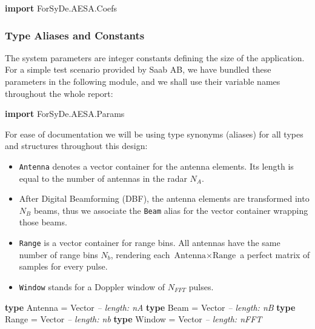 \documentclass[
  a4paper,
]{article}
\newenvironment{Shaded}{}{}
\newcommand{\CommentTok}[1]{\textcolor[rgb]{0.38,0.63,0.69}{\textit{#1}}}
\newcommand{\DataTypeTok}[1]{\textcolor[rgb]{0.56,0.13,0.00}{#1}}
\newcommand{\FunctionTok}[1]{\textcolor[rgb]{0.02,0.16,0.49}{#1}}
\newcommand{\KeywordTok}[1]{\textcolor[rgb]{0.00,0.44,0.13}{\textbf{#1}}}
\begin{document}
\begin{Shaded}
\begin{Highlighting}[numbers=left,,firstnumber=81,]
\KeywordTok{import} \DataTypeTok{ForSyDe.AESA.Coefs}
\end{Highlighting}
\end{Shaded}

\hypertarget{sec:aliases-shallow}{%
\subsubsection{Type Aliases and Constants}\label{sec:aliases-shallow}}

The system parameters are integer constants defining the size of the
application. For a simple test scenario provided by Saab AB, we have
bundled these parameters in the following module, and we shall use their
variable names throughout the whole report:

\begin{Shaded}
\begin{Highlighting}[numbers=left,,firstnumber=89,]
\KeywordTok{import} \DataTypeTok{ForSyDe.AESA.Params}
\end{Highlighting}
\end{Shaded}

For ease of documentation we will be using type synonyms (aliases) for
all types and structures throughout this design:

\begin{itemize}
\item
  \texttt{Antenna} denotes a vector container for the antenna elements.
  Its length is equal to the number of antennas in the radar \(N_A\).
\item
  After Digital Beamforming (DBF), the antenna elements are transformed
  into \(N_B\) beams, thus we associate the \texttt{Beam} alias for the
  vector container wrapping those beams.
\item
  \texttt{Range} is a vector container for range bins. All antennas have
  the same number of range bins \(N_b\), rendering each
  \(\text{Antenna} \times \text{Range}\) a perfect matrix of samples for
  every pulse.
\item
  \texttt{Window} stands for a Doppler window of \(N_{FFT}\) pulses.
\end{itemize}

\begin{Shaded}
\begin{Highlighting}[numbers=left,,firstnumber=107,]
\KeywordTok{type} \DataTypeTok{Antenna}     \FunctionTok{=} \DataTypeTok{Vector} \CommentTok{-- length: nA}
\KeywordTok{type} \DataTypeTok{Beam}        \FunctionTok{=} \DataTypeTok{Vector} \CommentTok{-- length: nB}
\KeywordTok{type} \DataTypeTok{Range}       \FunctionTok{=} \DataTypeTok{Vector} \CommentTok{-- length: nb}
\KeywordTok{type} \DataTypeTok{Window}      \FunctionTok{=} \DataTypeTok{Vector} \CommentTok{-- length: nFFT}
\end{Highlighting}
\end{Shaded}
\end{document}
